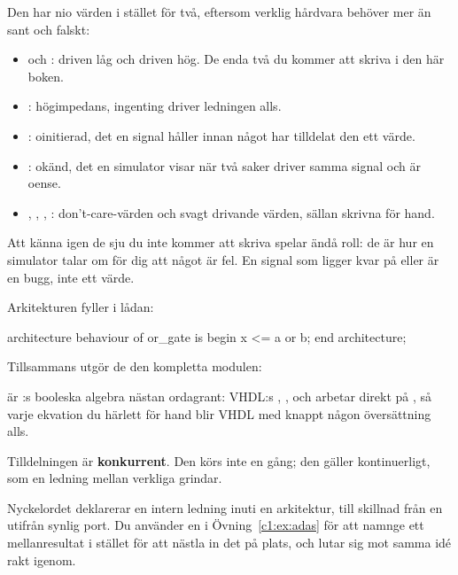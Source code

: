Den har nio värden i stället för två, eftersom verklig hårdvara behöver mer än sant och falskt:
\begin{itemize}
  \item {} och : driven låg och driven hög. De enda två du kommer att skriva i
    den här boken.
  \item {}: högimpedans, ingenting driver ledningen alls.
  \item {}: oinitierad, det en signal håller innan något har tilldelat den ett värde.
  \item {}: okänd, det en simulator visar när två saker driver samma signal och är oense.
  \item {}, , , : don't-care-värden och svagt drivande
    värden, sällan skrivna för hand.
\end{itemize}

Att känna igen de sju du inte kommer att skriva spelar ändå roll: de är hur en simulator talar om
för dig att något är fel. En signal som ligger kvar på  eller  är en bugg,
inte ett värde.

Arkitekturen fyller i lådan:

\begin{vhdlcode}
architecture behaviour of or_gate is
begin
    x <= a or b;
end architecture;
\end{vhdlcode}


Tillsammans utgör de den kompletta modulen:


 är :s booleska algebra nästan ordagrant: VHDL:s
, ,  och  arbetar direkt på , så varje
ekvation du härlett för hand blir VHDL med knappt någon översättning alls.

Tilldelningen är \textbf{konkurrent}. Den körs inte en gång; den gäller kontinuerligt, som en
ledning mellan verkliga grindar.

Nyckelordet  deklarerar en intern ledning inuti en arkitektur, till skillnad från en
utifrån synlig port. Du använder en i Övning~\ref{c1:ex:adas} för att namnge ett mellanresultat i
stället för att nästla in det på plats, och  lutar sig mot samma idé rakt igenom.

